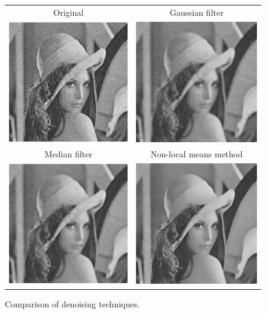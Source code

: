 \begin{figure}
\centering
{\sffamily
\begin{tabular}{cc}
Original & Gaussian filter \\
\includegraphics[width=.4\linewidth]{img/preprocessing/denoise_orig.png}
&
\includegraphics[width=.4\linewidth]{img/preprocessing/denoise_gauss.png}
\vspace{1em} \\
Median filter & Non-local means method \\
\includegraphics[width=.4\linewidth]{img/preprocessing/denoise_median.png}
&
\includegraphics[width=.4\linewidth]{img/preprocessing/denoise_nonlocal.png}
\end{tabular}
}
\caption{Comparison of denoising techniques.}
\label{fig:denoising}
\end{figure}

